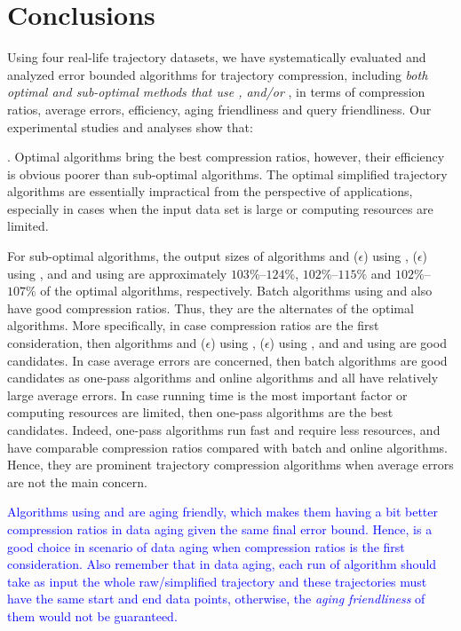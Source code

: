 \vspace{-1ex}
\section{Conclusions}

Using four real-life trajectory datasets, we have systematically evaluated and analyzed error bounded \lsa algorithms for trajectory compression, including \emph{both optimal and sub-optimal methods that use \ped, \sed and/or \dad},  in terms of compression ratios, average errors, efficiency, aging friendliness and query friendliness.
Our experimental studies and analyses show that:


. Optimal algorithms bring the best compression ratios, however, their efficiency is obvious poorer than sub-optimal algorithms. The optimal simplified trajectory algorithms are essentially impractical from the perspective of applications, especially in cases when the input data set is large or computing resources are limited.

For sub-optimal algorithms, the output sizes of algorithms \bqsa and \siped($\epsilon$) using \ped, \cised($\epsilon$) using \sed, and \tpa and \interval using \dad are approximately $103\%$--$124\%$, $102\%$--$115\%$ and $102\%$--$107\%$ of the optimal algorithms, respectively. Batch algorithms using \ped and \sed also have good compression ratios. Thus, they are the alternates of the optimal algorithms.
%
More specifically, in case compression ratios are the first consideration, then algorithms \bqsa and \siped($\epsilon$) using \ped, \cised($\epsilon$) using \sed, and \tpa and \interval using \dad are good candidates.
%
In case average errors are concerned, then batch algorithms are good candidates as one-pass algorithms and online algorithms \opwa and \bqsa all have relatively large average errors. %
%
In case running time is the most important factor or computing resources are limited, then one-pass algorithms are the best candidates.
%
Indeed, one-pass algorithms run fast and require less resources, and have comparable compression ratios compared with batch and online algorithms. Hence, they are prominent trajectory compression algorithms when average errors are not the main concern.

\textcolor{blue}{Algorithms \dpa using \ped and \sed are aging friendly, which makes them having a bit better compression ratios in data aging given the same final error bound. Hence, \dpa is a good choice in scenario of data aging when compression ratios is the first consideration. Also remember that in data aging, each run of algorithm \dpa should take as input the whole raw/simplified trajectory and these trajectories must have the same start and end data points, otherwise, the \emph{aging friendliness} of them would not be guaranteed.}
 
